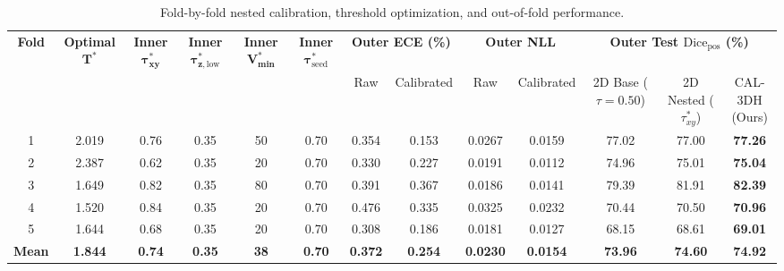 \documentclass[preprint,12pt,authoryear]{elsarticle}
\begin{document}
\begin{table}[tbp]
\centering
\caption{Fold-by-fold nested calibration, threshold optimization, and out-of-fold performance.}
\label{tab:calibration_folds}
\setlength{\tabcolsep}{1.2pt}
\scriptsize
\begin{tabular*}{\textwidth}{@{\extracolsep{\fill}}ccccccccccccc}
\toprule
\textbf{Fold} & \shortstack{\textbf{Optimal} \\ $\mathbf{T^*}$} & \shortstack{\textbf{Inner} \\ $\mathbf{\tau_{xy}^*}$} & \shortstack{\textbf{Inner} \\ $\mathbf{\tau_{z,\mathrm{low}}^*}$} & \shortstack{\textbf{Inner} \\ $\mathbf{V_{\min}^*}$} & \shortstack{\textbf{Inner} \\ $\mathbf{\tau_{\mathrm{seed}}^*}$} & \multicolumn{2}{c}{\textbf{Outer ECE (\%)}} & \multicolumn{2}{c}{\textbf{Outer NLL}} & \multicolumn{3}{c}{\textbf{Outer Test $\text{Dice}_{\text{pos}}$ (\%)}} \\
\cmidrule(lr){7-8} \cmidrule(lr){9-10} \cmidrule(lr){11-13}
& & & & & & Raw & Calibrated & Raw & Calibrated & \shortstack{2D Base \\ ($\tau=0.50$)} & \shortstack{2D Nested \\ ($\tau_{xy}^*$)} & \shortstack{CAL-3DH \\ (Ours)} \\
\midrule
1 & 2.019 & 0.76 & 0.35 & 50 & 0.70 & 0.354 & 0.153 & 0.0267 & 0.0159 & 77.02 & 77.00 & \textbf{77.26} \\
2 & 2.387 & 0.62 & 0.35 & 20 & 0.70 & 0.330 & 0.227 & 0.0191 & 0.0112 & 74.96 & 75.01 & \textbf{75.04} \\
3 & 1.649 & 0.82 & 0.35 & 80 & 0.70 & 0.391 & 0.367 & 0.0186 & 0.0141 & 79.39 & 81.91 & \textbf{82.39} \\
4 & 1.520 & 0.84 & 0.35 & 20 & 0.70 & 0.476 & 0.335 & 0.0325 & 0.0232 & 70.44 & 70.50 & \textbf{70.96} \\
5 & 1.644 & 0.68 & 0.35 & 20 & 0.70 & 0.308 & 0.186 & 0.0181 & 0.0127 & 68.15 & 68.61 & \textbf{69.01} \\
\midrule
\textbf{Mean} & \textbf{1.844} & \textbf{0.74} & \textbf{0.35} & \textbf{38} & \textbf{0.70} & \textbf{0.372} & \textbf{0.254} & \textbf{0.0230} & \textbf{0.0154} & \textbf{73.96} & \textbf{74.60} & \textbf{74.92} \\
\bottomrule
\end{tabular*}
\end{table}
\end{document}
